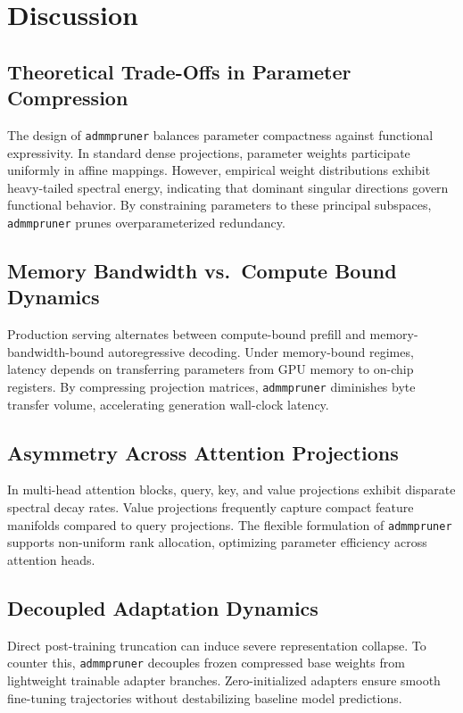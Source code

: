 \section{Discussion}

\subsection{Theoretical Trade-Offs in Parameter Compression}
The design of \texttt{admmpruner} balances parameter compactness against functional expressivity. In standard dense projections, parameter weights participate uniformly in affine mappings. However, empirical weight distributions exhibit heavy-tailed spectral energy, indicating that dominant singular directions govern functional behavior. By constraining parameters to these principal subspaces, \texttt{admmpruner} prunes overparameterized redundancy.

\subsection{Memory Bandwidth vs.\ Compute Bound Dynamics}
Production serving alternates between compute-bound prefill and memory-bandwidth-bound autoregressive decoding. Under memory-bound regimes, latency depends on transferring parameters from GPU memory to on-chip registers. By compressing projection matrices, \texttt{admmpruner} diminishes byte transfer volume, accelerating generation wall-clock latency.

\subsection{Asymmetry Across Attention Projections}
In multi-head attention blocks, query, key, and value projections exhibit disparate spectral decay rates. Value projections frequently capture compact feature manifolds compared to query projections. The flexible formulation of \texttt{admmpruner} supports non-uniform rank allocation, optimizing parameter efficiency across attention heads.

\subsection{Decoupled Adaptation Dynamics}
Direct post-training truncation can induce severe representation collapse. To counter this, \texttt{admmpruner} decouples frozen compressed base weights from lightweight trainable adapter branches. Zero-initialized adapters ensure smooth fine-tuning trajectories without destabilizing baseline model predictions.

